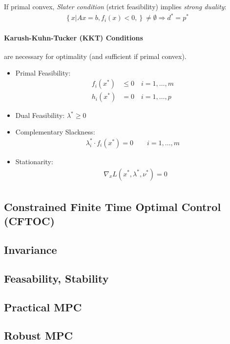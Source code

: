 \documentclass[landscape,a4paper,8pt]{scrartcl}
\begin{document}
\begin{multicols*}{3}
If primal convex, \emph{Slater condition} (strict feasibility) implies \emph{strong duality}:
\begin{align*}
	\left\{x \left| \right. Ax=b, f_i(x)<0, \right\} \neq \emptyset \Rightarrow d^*  = p^*
\end{align*}

\paragraph{Karush-Kuhn-Tucker (KKT) Conditions}
are necessary for optimality (and sufficient if primal convex).
\begin{itemize}
	\item Primal Feasibility:
		\begin{align*}
			f_i(x^*) &\leq 0 \quad i=1,\dots,m\\
			h_i(x^*) &=0 \quad i=1,\dots,p
		\end{align*}
	\item Dual Feasibility:  $\lambda^* \geq 0$
	\item Complementary Slackness:
		\begin{align*}
			\lambda_i^* \cdot f_i(x^*) = 0 \quad \quad i=1,\dots,m
		\end{align*}
	\item Stationarity:
		\begin{align*}
			&\nabla_x L(x^*,\lambda^*,\nu^*) =0 \\
		\end{align*}
\end{itemize}

\subsection{Constrained Finite Time Optimal Control (CFTOC)}

\subsection{Invariance}
\subsection{Feasability, Stability}

\subsection{Practical MPC}
\subsection{Robust MPC}

\end{multicols*}
\end{document}
